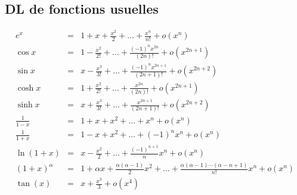 \documentclass[french]{yLectureNote}
\begin{document}
\subsection{DL de fonctions usuelles}
\begin{eqnarray*}
e^x&=&1+x+\frac{x^2}2+\dots+\frac{x^n}{n!}+o(x^n)\\
\cos x&=&1-\frac{x^2}{2!}+\dots+\frac{(-1)^n x^{2n}}{(2n)!}+o(x^{2n+1})\\
\sin x&=&x-\frac{x^3}{3!}+\dots+\frac{(-1)^n x^{2n+1}}{(2n+1)!}+o(x^{2n+2})\\
\cosh x&=&1+\frac{x^2}{2!}+\dots+\frac{x^{2n}}{(2n)!}+o(x^{2n+1})\\
\sinh x&=&x+\frac{x^3}{3!}+\dots+\frac{ x^{2n+1}}{(2n+1)!}+o(x^{2n+2})\\
\frac{1}{1-x}&=&1+x+x^2+\dots+x^n+o(x^n)\\
\frac{1}{1+x}&=&1-x+x^2+\dots+(-1)^nx^n+o(x^n)\\
\ln(1+x)&=&x-\frac{x^2}2+\dots+\frac{(-1)^{n+1}}{n}x^n+o(x^n)\\
(1+x)^\alpha&=&1+\alpha x+\frac{\alpha(\alpha-1)}2x^2+\dots+\frac{\alpha(\alpha-1)\cdots (\alpha-n+1)}{n!}x^n+o(x^n)\\
\tan(x) &=& x+\frac{x^3}{3}+o(x^4)\\
\end{eqnarray*}
\end{document}
